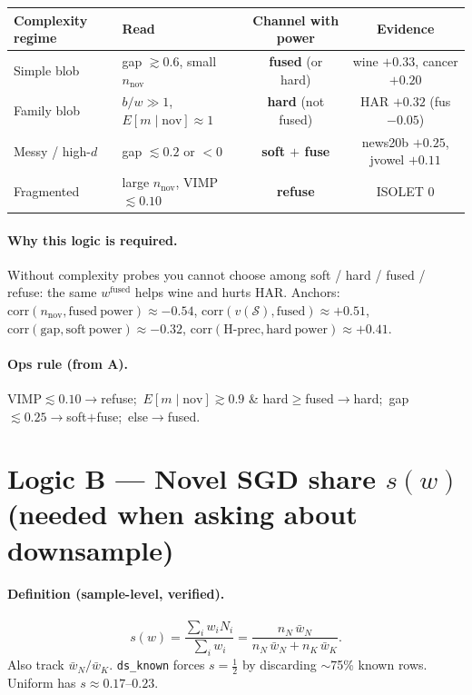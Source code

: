 \documentclass[11pt]{article}
\begin{document}
\begin{center}
\scriptsize
\begin{tabular}{@{}llcc@{}}
\toprule
Complexity regime & Read & Channel with power & Evidence \\
\midrule
Simple blob
  & gap $\gtrsim 0.6$, small $n_{\mathrm{nov}}$
  & \textbf{fused} (or hard)
  & wine $+0.33$, cancer $+0.20$ \\
Family blob
  & $b/w\gg 1$, $E[m\mid\mathrm{nov}]\approx 1$
  & \textbf{hard} (not fused)
  & HAR $+0.32$ (fus $-0.05$) \\
Messy / high-$d$
  & gap $\lesssim 0.2$ or $<0$
  & \textbf{soft $+$ fuse}
  & news20b $+0.25$, jvowel $+0.11$ \\
Fragmented
  & large $n_{\mathrm{nov}}$, VIMP $\lesssim 0.10$
  & \textbf{refuse}
  & ISOLET $0$ \\
\bottomrule
\end{tabular}
\end{center}

\paragraph{Why this logic is required.}
Without complexity probes you cannot choose among soft / hard / fused / refuse:
the same $w^{\mathrm{fused}}$ helps wine and hurts HAR.
Anchors:
$\mathrm{corr}(n_{\mathrm{nov}},\mathrm{fused\ power})\approx -0.54$,
$\mathrm{corr}(v(\mathcal{S}),\mathrm{fused})\approx +0.51$,
$\mathrm{corr}(\mathrm{gap},\mathrm{soft\ power})\approx -0.32$,
$\mathrm{corr}(\mathrm{H\text{-}prec},\mathrm{hard\ power})\approx +0.41$.

\paragraph{Ops rule (from A).}
VIMP$\lesssim 0.10\to$refuse;\ 
$E[m\mid\mathrm{nov}]\gtrsim 0.9$ \& hard$\ge$fused$\to$hard;\ 
gap$\lesssim 0.25\to$soft$+$fuse;\ 
else$\to$fused.

\section{Logic B --- Novel SGD share $s(w)$
(needed when asking about downsample)}

\paragraph{Definition (sample-level, verified).}
\[
s(w)
=\frac{\sum_i w_i N_i}{\sum_i w_i}
=\frac{n_N\,\bar w_N}{n_N\,\bar w_N+n_K\,\bar w_K}.
\]
Also track $\bar w_N/\bar w_K$.
\texttt{ds\_known} forces $s=\tfrac12$ by discarding $\sim$75\% known rows.
Uniform has $s\approx 0.17$--$0.23$.
\end{document}
